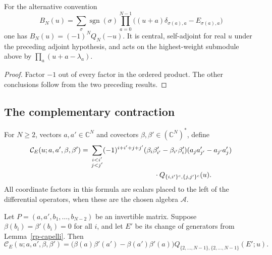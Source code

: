 \begin{corollary}\label{rp-negative-convention}
For the alternative convention
\[
 B_N(u)=\sum_{\sigma}\operatorname{sgn}(\sigma)
           \prod_{a=0}^{N-1}
             \bigl((u+a)\delta_{\sigma(a),a}-E_{\sigma(a),a}\bigr)
\]
one has $B_N(u)=(-1)^NQ_N(-u)$.  It is central,
self-adjoint for real $u$ under the preceding adjoint
hypothesis, and acts on the highest-weight submodule
above by $\prod_a(u+a-\lambda_a)$.
\end{corollary}

\begin{proof}
Factor $-1$ out of every factor in the ordered product.
The other conclusions follow from the two preceding
results.
\end{proof}

\subsection{The complementary contraction}

For $N\geq2$, vectors $a,a'\in\mathbb C^N$ and covectors
$\beta,\beta'\in(\mathbb C^N)^*$, define
\begin{align}
 \mathcal C_E(u;a,a',\beta,\beta')
 ={}&\sum_{\substack{i<i'\\j<j'}}
       (-1)^{i+i'+j+j'}
       (\beta_i\beta'_{i'}-\beta_{i'}\beta'_i)
       (a_ja'_{j'}-a_{j'}a'_j)\notag\\
 &\hspace{32mm}\cdot Q_{\{i,i'\}^{c},\{j,j'\}^{c}}(u).
 \label{rp-contraction}
\end{align}
All coordinate factors in this formula are scalars placed
to the left of the differential operators, when these
are the chosen algebra $\mathcal A$.

\begin{lemma}\label{rp-adapted-contraction}
Let $P=(a,a',b_1,\ldots,b_{N-2})$ be an invertible matrix.
Suppose $\beta(b_i)=\beta'(b_i)=0$ for all $i$, and let
$E'$ be its change of generators from Lemma~\ref{rp-capelli}.
Then
\begin{equation}\label{rp-contraction-adapted}
 \mathcal C_E(u;a,a',\beta,\beta')
 =\bigl(\beta(a)\beta'(a')-\beta(a')\beta'(a)\bigr)
     Q_{\{2,\ldots,N-1\},\{2,\ldots,N-1\}}(E';u).
\end{equation}
\end{lemma}

